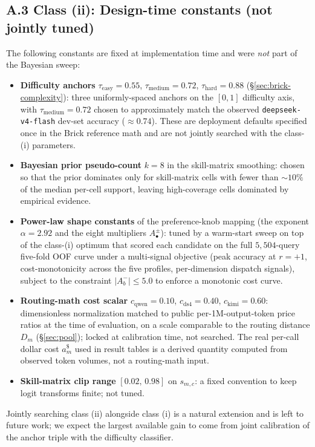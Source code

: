\documentclass[twocolumn,10pt,a4paper]{article}
\begin{document}
\subsection*{A.3 Class (ii): Design-time constants (not jointly tuned)}
The following constants are fixed at implementation time and were \emph{not} part of the Bayesian sweep:
\begin{itemize}\setlength{\itemsep}{3pt}
  \item \textbf{Difficulty anchors} $\tau_\text{easy}{=}0.55$, $\tau_\text{medium}{=}0.72$, $\tau_\text{hard}{=}0.88$ (§\ref{sec:brick-complexity}): three uniformly-spaced anchors on the $[0,1]$ difficulty axis, with $\tau_\text{medium}{=}0.72$ chosen to approximately match the observed \texttt{deepseek-v4-flash} dev-set accuracy ($\approx 0.74$). These are deployment defaults specified once in the Brick reference math and are not jointly searched with the class-(i) parameters.
  \item \textbf{Bayesian prior pseudo-count} $k{=}8$ in the skill-matrix smoothing: chosen so that the prior dominates only for skill-matrix cells with fewer than ${\sim}10\%$ of the median per-cell support, leaving high-coverage cells dominated by empirical evidence.
  \item \textbf{Power-law shape constants} of the preference-knob mapping (the exponent $\alpha{=}2.92$ and the eight multipliers $A_{\bullet}^{\pm}$): tuned by a warm-start sweep on top of the class-(i) optimum that scored each candidate on the full $5{,}504$-query five-fold OOF curve under a multi-signal objective (peak accuracy at $r{=}{+}1$, cost-monotonicity across the five profiles, per-dimension dispatch signals), subject to the constraint $|A_b^{-}|\!\le\!5.0$ to enforce a monotonic cost curve.
  \item \textbf{Routing-math cost scalar} $c_\text{qwen}{=}0.10$, $c_\text{ds4}{=}0.40$, $c_\text{kimi}{=}0.60$: dimensionless normalization matched to public per-1M-output-token price ratios at the time of evaluation, on a scale comparable to the routing distance $D_m$ (§\ref{sec:pool}); locked at calibration time, not searched. The real per-call dollar cost $a_m^{\$}$ used in result tables is a derived quantity computed from observed token volumes, not a routing-math input.
  \item \textbf{Skill-matrix clip range} $[0.02,\,0.98]$ on $s_{m,c}$: a fixed convention to keep logit transforms finite; not tuned.
\end{itemize}
Jointly searching class (ii) alongside class (i) is a natural extension and is left to future work; we expect the largest available gain to come from joint calibration of the anchor triple with the difficulty classifier.
\end{document}
